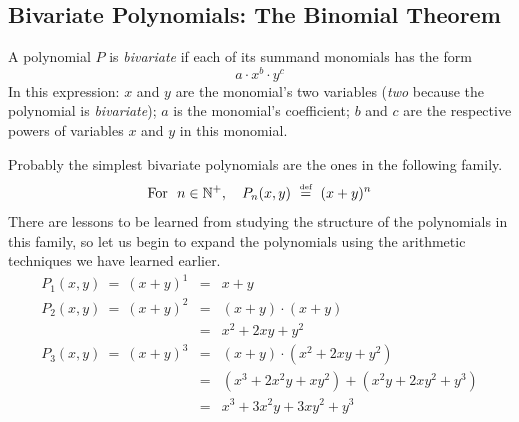 \subsection{Bivariate Polynomials: The Binomial Theorem}
\label{sec:bivariate-polynomials}
\label{sec:Binomial-thm}

A polynomial $P$ is {\em bivariate} if each of its summand monomials has the form
\[ a \cdot x^b \cdot y^c \]
In this expression: $x$ and $y$ are the monomial's two variables ({\em two} because the polynomial is {\em bivariate}); $a$ is the monomial's coefficient; $b$ and $c$ are the respective powers of variables $x$ and $y$ in this monomial.

\smallskip

Probably the simplest bivariate polynomials are the ones in the following family.
\begin{equation}
\label{eq:binomial-polys}
\mbox{For } \ n \in \mathbb{N}^+, \ \ \
P_n(x,y) \ \stackrel{\mbox{{\tiny def}}}{=} \ (x+y)^n
\end{equation}
There are lessons to be learned from studying the structure of the polynomials in this family, so let us begin to expand the polynomials using the arithmetic techniques we have learned earlier.
\begin{eqnarray*}
P_1(x,y) \ = \
(x+y)^1 & = & x+y  \\
P_2(x,y) \ = \
(x+y)^2 & = & (x+y) \cdot (x+y) \\
             & = & x^2 + 2xy + y^2 \\
P_3(x,y) \ = \
(x+y)^3 & = & (x+y) \cdot (x^2 + 2xy + y^2) \\
            & = & (x^3 + 2x^2y +  xy^2) + (x^2y + 2xy^2 + y^3) \\
            & = & x^3 + 3x^2y + 3xy^2 + y^3  
\end{eqnarray*}

